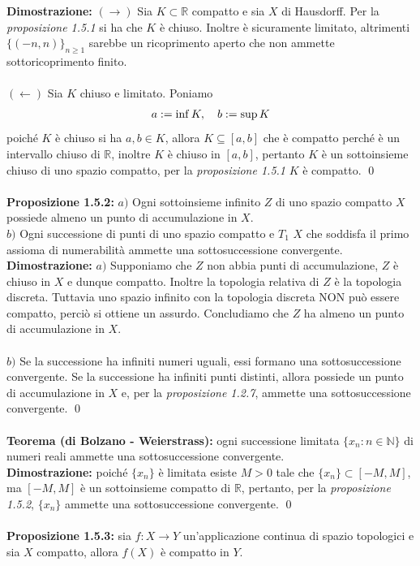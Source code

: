 \documentclass{article}
\begin{document}
\textbf{Dimostrazione:} $(\rightarrow)$ Sia $K \subset \mathbb{R}$ compatto e sia $X$ di Hausdorff. Per la \textit{proposizione 1.5.1} si ha che $K$ è chiuso. Inoltre è sicuramente limitato, altrimenti $\{ (-n, n) \}_{n \geq 1}$ sarebbe un ricoprimento aperto che non ammette sottoricoprimento finito. \\ \\
$(\leftarrow)$ Sia $K$ chiuso e limitato. Poniamo
\begin{gather}
    a := \inf K, \quad b := \sup K \notag
\end{gather}
poiché $K$ è chiuso si ha $a, b \in K$, allora $K \subseteq [a, b]$ che è compatto perché è un intervallo chiuso di $\mathbb{R}$, inoltre $K$ è chiuso in $[a, b]$, pertanto $K$ è un sottoinsieme chiuso di uno spazio compatto, per la \textit{proposizione 1.5.1} $K$ è compatto. \qed \\ \\
\textbf{Proposizione 1.5.2:} $a)$ Ogni sottoinsieme infinito $Z$ di uno spazio compatto $X$ possiede almeno un punto di accumulazione in $X$. \\
$b)$ Ogni successione di punti di uno spazio compatto e $T_1$ $X$ che soddisfa il primo assioma di numerabilità ammette una sottosuccessione convergente. \\

\textbf{Dimostrazione:} $a)$ Supponiamo che $Z$ non abbia punti di accumulazione, $Z$ è chiuso in $X$ e dunque compatto. Inoltre la topologia relativa di $Z$ è la topologia discreta. Tuttavia uno spazio infinito con la topologia discreta NON può essere compatto, perciò si ottiene un assurdo. Concludiamo che $Z$ ha almeno un punto di accumulazione in $X$. \\ \\
$b)$ Se la successione ha infiniti numeri uguali, essi formano una sottosuccessione convergente. Se la successione ha infiniti punti distinti, allora possiede un punto di accumulazione in $X$ e, per la \textit{proposizione 1.2.7}, ammette una sottosuccessione convergente. \qed \\ \\
\textbf{Teorema (di Bolzano - Weierstrass):} ogni successione limitata $\{ x_n : n \in \mathbb{N} \}$ di numeri reali ammette una sottosuccessione convergente. \\

\textbf{Dimostrazione:} poiché $\{ x_n \}$ è limitata esiste $M > 0$ tale che $\{ x_n \} \subset [-M, M]$, ma $[-M, M]$ è un sottoinsieme compatto di $\mathbb{R}$, pertanto, per la \textit{proposizione 1.5.2}, $\{ x_n \}$ ammette una sottosuccessione convergente. \qed \\ \\
\textbf{Proposizione 1.5.3:} sia $f : X \longrightarrow Y$ un'applicazione continua di spazio topologici e sia $X$ compatto, allora $f(X)$ è compatto in $Y$. \\
\end{document}
